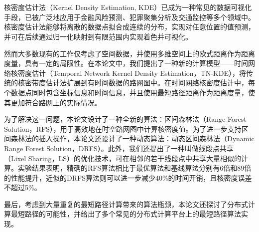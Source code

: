 \vspace{-2.5cm}
\chapter*{\xiaosan {}}
\hspace{-0.5cm}

核密度估计法（Kernel Density Estimation, KDE）已成为一种常见的数据可视化手段，已被广泛地应用于金融风险预测、犯罪聚集分析及交通监控等多个领域中。核密度估计法能够将离散的数据点拟合成连续的分布，实现对任意位置的值预测，并可在后续通过归一化映射到有限范围内实现着色并可视化。

然而大多数现有的工作仅考虑了空间数据，并使用多维空间上的欧式距离作为距离度量，具有一定的局限性。在本论文中，我们提出了一种新的计算模型——时间网络核密度估计（Temporal Network Kernel Density Estimation，TN-KDE），将传统的核密带度估计法扩展到有时间数据的路网图中。在时间网络核密度估计中，每个数据点同时包含坐标信息和时间信息，并且使用最短路径距离作为距离度量，使其更加符合路网上的实际情况。

为了解决这一问题，本论文设计了一种全新的算法：区间森林法（Range Forest Solution，RFS），用于高效地在时空路网图中计算核密度值。为了进一步支持区间森林法的插入操作，本论文还设计了一种动态算法：动态区间森林法（Dynamic Range Forest Solution，DRFS）。此外，我们还提出了一种叫做线段点共享（Lixel Sharing，LS）的优化技术，可在相邻的若干线段点中共享大量相似的计算。实验结果表明，精确的RFS算法相比于最优算法和基线算法分别有6倍和89倍的性能提升，近似的DRFS算法则可以进一步减少40\%的时间开销，且核密度误差不超过5\%。

最后，考虑到大量重复的最短路径计算带来的算法瓶颈，本论文还探讨了分布式计算最短路径的可能性，并给出了多个常见的分布式计算平台上的最短路径算法实现。


 